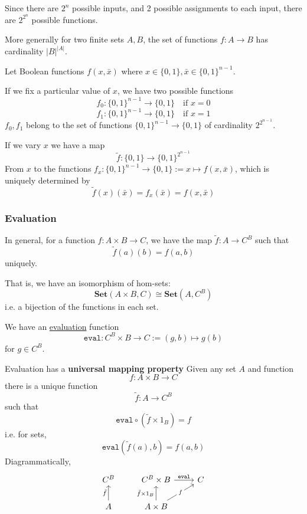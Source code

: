 \documentclass[11pt]{article} %
\theoremstyle{definition}
\theoremstyle{definition}
\theoremstyle{definition}
\begin{document}
Since there are $2^n$ possible inputs, and 2 possible assignments to each input, 
there are $2^{2^n}$ possible functions.

More generally for two finite sets $A,B$, the set of functions $f:A\rightarrow B$ has cardinality $|B|^{|A|}$.

Let Boolean functions $f(x, \bar{x})$ where $x\in\{0,1\},\bar{x}\in \{0,1\}^{n-1}$.

If we fix a particular value of $x$, we have two possible functions
\[f_0:\{0,1\}^{n-1}\rightarrow\{0,1\} \quad\text{if } x=0\]
\[f_1:\{0,1\}^{n-1}\rightarrow\{0,1\} \quad\text{if } x=1\]
$f_0,f_1$ belong to the set of functions $\{0,1\}^{n-1}\rightarrow\{0,1\}$ of cardinality $2^{2^{n-1}}$.

If we vary $x$ we have a map
\[\tilde{f}:\{0,1\}\rightarrow\{0,1\}^{2^{n-1}}\]
From $x$ to the functions $f_x: \{0,1\}^{n-1} \rightarrow \{0,1\} := x \mapsto f(x,\bar{x})$, 
which is uniquely determined by 
\[\tilde{f}(x)(\bar{x}) = f_x(\bar{x}) = f(x,\bar{x})\]

\subsubsection{Evaluation}
In general, for a function $f:A\times B\rightarrow C$, we have the map $\tilde{f}:A\rightarrow C^B$
such that 
\[\tilde{f}(a)(b)=f(a,b)\]
uniquely.

That is, we have an isomorphism of hom-sets:
\[\textbf{Set}(A\times B,C)\cong \textbf{Set}(A,C^B)\]
i.e. a bijection of the functions in each set.

We have an \underline{evaluation} function 
\[\texttt{eval}:C^B\times B\rightarrow C := (g,b) \mapsto g(b)\]
for $g\in C^B$. 

Evaluation has a \textbf{universal mapping property}
Given any set $A$ and function
\[f:A\times B\rightarrow C\]
there is a unique function 
\[\tilde{f}: A\rightarrow C^B\]
such that
\[\texttt{eval}\circ (\tilde{f}\times 1_B) = f\]
i.e. for sets,
\[\texttt{eval}(\tilde{f}(a),b)=f(a,b)\]
Diagrammatically,
\[\begin{tikzcd}
	{C^B} & {C^B\times B} & C \\
	A & {A\times B}
	\arrow["{\tilde{f}}", from=2-1, to=1-1]
	\arrow["{\tilde{f}\times1_B}", from=2-2, to=1-2]
	\arrow["{\texttt{eval}}", from=1-2, to=1-3]
	\arrow["f"{description}, from=2-2, to=1-3]
\end{tikzcd}\]
\end{document}
